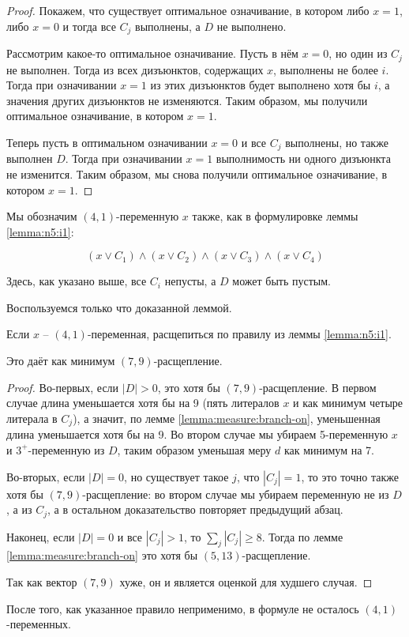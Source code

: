 \begin{proof}
 Покажем, что существует оптимальное означивание, в котором либо $x = 1$, либо $x = 0$ и тогда все $C_j$ выполнены, а $D$ не выполнено.

 Рассмотрим какое-то оптимальное означивание. Пусть в нём $x = 0$, но один из $C_j$ не выполнен. Тогда из всех дизъюнктов, содержащих $x$, выполнены не более $i$. Тогда при означивании $x = 1$ из этих дизъюнктов будет выполнено хотя бы $i$, а значения других дизъюнктов не изменяются. Таким образом, мы получили оптимальное означивание, в котором $x = 1$.

 Теперь пусть в оптимальном означивании $x = 0$ и все $C_j$ выполнены, но также выполнен $D$. Тогда при означивании $x = 1$ выполнимость ни одного дизъюнкта не изменится. Таким образом, мы снова получили оптимальное означивание, в котором $x = 1$.
\end{proof}

Мы обозначим $(4,1)$-переменную $x$ также, как в формулировке леммы \ref{lemma:n5:i1}:

$$
 (x \vee C_1) \wedge (x \vee C_2) \wedge (x \vee C_3) \wedge (x \vee C_4)
$$

Здесь, как указано выше, все $C_i$ непусты, а $D$ может быть пустым.

Воспользуемся только что доказанной леммой.

\begin{brule}
 Если $x$ -- $(4,1)$-переменная, расщепиться по правилу из леммы \ref{lemma:n5:i1}.

 Это даёт как минимум $(7,9)$-расщепление.
 \label{brule:n5:41}
\end{brule}

\begin{proof}
 Во-первых, если $|D| > 0$, это хотя бы $(7,9)$-расщепление. В первом случае длина уменьшается хотя бы на 9 (пять литералов $x$ и как минимум четыре литерала в $C_j$), а значит, по лемме \ref{lemma:measure:branch-on}, уменьшенная длина уменьшается хотя бы на 9. Во втором случае мы убираем 5-переменную $x$ и $3^+$-переменную из $D$, таким образом уменьшая меру $d$ как минимум на 7.

 Во-вторых, если $|D| = 0$, но существует такое $j$, что $|C_j| = 1$, то это точно также хотя бы $(7,9)$-расщепление: во втором случае мы убираем переменную не из $D$, а из $C_j$, а в остальном доказательство повторяет предыдущий абзац.

 Наконец, если $|D| = 0$ и все $|C_j| > 1$, то $\sum_j |C_j| \geq 8$. Тогда по лемме \ref{lemma:measure:branch-on} это хотя бы $(5,13)$-расщепление.

 Так как вектор $(7,9)$ хуже, он и является оценкой для худшего случая.
\end{proof}

После того, как указанное правило неприменимо, в формуле не осталось $(4,1)$-переменных.

